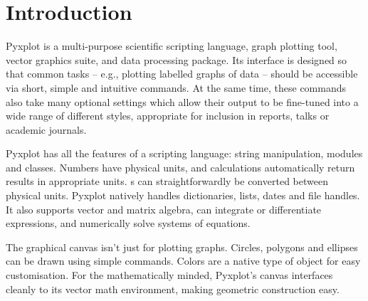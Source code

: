 %
%
%
%
%



\chapter{Introduction}

\label{ch:introduction}

{\sc Pyxplot} is a multi-purpose scientific scripting language, graph plotting
tool, vector graphics suite, and data processing package.  Its interface is
designed so that common tasks -- e.g., plotting labelled graphs of data --
should be accessible via short, simple and intuitive commands. At the same
time, these commands also take many optional settings which allow their output
to be fine-tuned into a wide range of different styles, appropriate for
inclusion in reports, talks or academic journals.


Pyxplot has all the features of a scripting language: string manipulation,
modules and classes. Numbers have physical units, and calculations
automatically return results in appropriate units. \Datafile s can
straightforwardly be converted between physical units. Pyxplot natively handles
dictionaries, lists, dates and file handles. It also supports vector and matrix
algebra, can integrate or differentiate expressions, and numerically solve
systems of equations.


The graphical canvas isn't just for plotting graphs. Circles, polygons and
ellipses can be drawn using simple commands. Colors are a native type of object
for easy customisation. For the mathematically minded, Pyxplot's canvas
interfaces cleanly to its vector math environment, making geometric
construction easy.

